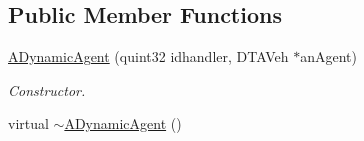 \subsection*{Public Member Functions}
\begin{DoxyCompactItemize}
\item 
\hyperlink{classADynamicAgent_a6535a8f571086793727c30b387c4883d}{A\+Dynamic\+Agent} (quint32 idhandler, D\+T\+A\+Veh $\ast$an\+Agent)
\begin{DoxyCompactList}\small\item\em Constructor. \end{DoxyCompactList}\item 
virtual \hyperlink{classADynamicAgent_ae1ba3cb111cb30562ad37df2aa0cda77}{$\sim$\+A\+Dynamic\+Agent} ()\hypertarget{classADynamicAgent_ae1ba3cb111cb30562ad37df2aa0cda77}{}\label{classADynamicAgent_ae1ba3cb111cb30562ad37df2aa0cda77}


\end{DoxyCompactItemize}
